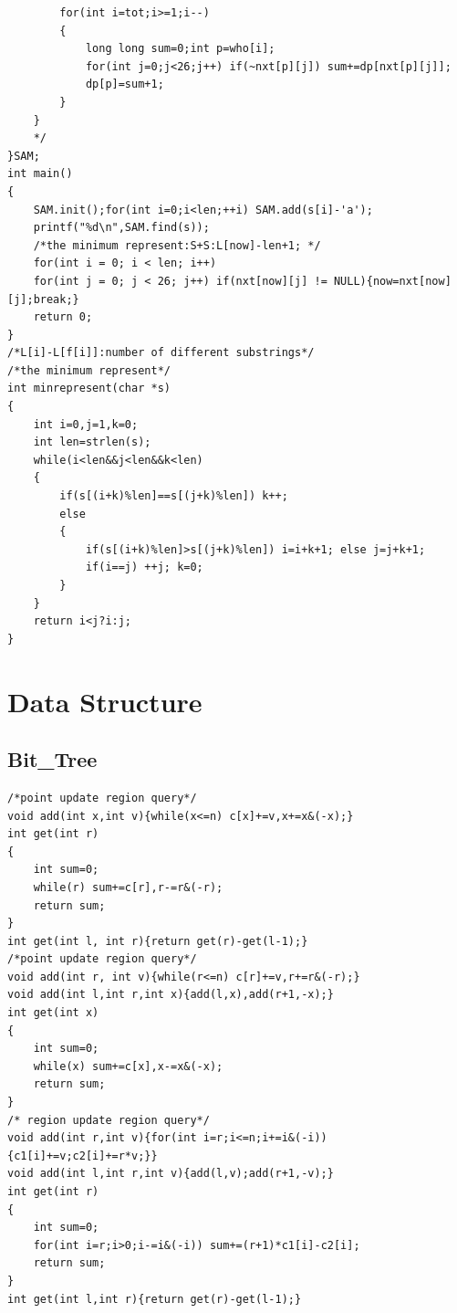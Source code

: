 \documentclass[twoside]{article}
\begin{document}
\begin{lstlisting}
        for(int i=tot;i>=1;i--)
        {
            long long sum=0;int p=who[i];
            for(int j=0;j<26;j++) if(~nxt[p][j]) sum+=dp[nxt[p][j]];
            dp[p]=sum+1;
        }
    }
    */
}SAM;
int main()
{
    SAM.init();for(int i=0;i<len;++i) SAM.add(s[i]-'a');
    printf("%d\n",SAM.find(s));
    /*the minimum represent:S+S:L[now]-len+1; */
    for(int i = 0; i < len; i++)
    for(int j = 0; j < 26; j++) if(nxt[now][j] != NULL){now=nxt[now][j];break;}
    return 0;
}
/*L[i]-L[f[i]]:number of different substrings*/
/*the minimum represent*/
int minrepresent(char *s)
{
    int i=0,j=1,k=0;
    int len=strlen(s);
    while(i<len&&j<len&&k<len)
    {
        if(s[(i+k)%len]==s[(j+k)%len]) k++;
        else
        {
            if(s[(i+k)%len]>s[(j+k)%len]) i=i+k+1; else j=j+k+1;
            if(i==j) ++j; k=0;
        }
    }
    return i<j?i:j;
}
\end{lstlisting}
\clearpage\section{Data Structure}
\subsection{Bit_Tree}
\begin{lstlisting}
/*point update region query*/
void add(int x,int v){while(x<=n) c[x]+=v,x+=x&(-x);}
int get(int r)
{
    int sum=0;
    while(r) sum+=c[r],r-=r&(-r);
    return sum;
}
int get(int l, int r){return get(r)-get(l-1);}
/*point update region query*/
void add(int r, int v){while(r<=n) c[r]+=v,r+=r&(-r);}
void add(int l,int r,int x){add(l,x),add(r+1,-x);}
int get(int x)
{
    int sum=0;
    while(x) sum+=c[x],x-=x&(-x);
    return sum;
}
/* region update region query*/
void add(int r,int v){for(int i=r;i<=n;i+=i&(-i)){c1[i]+=v;c2[i]+=r*v;}}
void add(int l,int r,int v){add(l,v);add(r+1,-v);}
int get(int r)
{
    int sum=0;
    for(int i=r;i>0;i-=i&(-i)) sum+=(r+1)*c1[i]-c2[i];
    return sum;
}
int get(int l,int r){return get(r)-get(l-1);}
\end{lstlisting}
\end{document}
